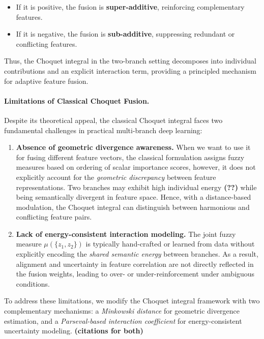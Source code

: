 \documentclass[12pt]{article}
\begin{document}
\begin{itemize}
    \item If it is positive, the fusion is \textbf{super-additive}, reinforcing complementary features.
    \item If it is negative, the fusion is \textbf{sub-additive}, suppressing redundant or conflicting features.
\end{itemize}

Thus, the Choquet integral in the two-branch setting decomposes into individual contributions and an explicit interaction term, providing a principled mechanism for adaptive feature fusion.

\paragraph{Limitations of Classical Choquet Fusion.}
Despite its theoretical appeal, the classical Choquet integral faces two fundamental challenges in practical multi-branch deep learning:

\begin{enumerate}
    \item \textbf{Absence of geometric divergence awareness.} When we want to use it for fusing different feature vectors, the classical formulation assigns fuzzy measures based on ordering of scalar importance scores, however, it does not explicitly account for the \emph{geometric discrepancy} between feature representations. Two branches may exhibit high individual energy \textbf{(??)} while being semantically divergent in feature space. Hence, with a distance-based modulation, the Choquet integral can distinguish between harmonious and conflicting feature pairs.

    \item \textbf{Lack of energy-consistent interaction modeling.} The joint fuzzy measure $\mu(\{z_1, z_2\})$ is typically hand-crafted or learned from data without explicitly encoding the \emph{shared semantic energy} between branches. As a result, alignment and uncertainty in feature correlation are not directly reflected in the fusion weights, leading to over- or under-reinforcement under ambiguous conditions.
\end{enumerate}

To address these limitations, we modify the Choquet integral framework with two complementary mechanisms: a \textit{Minkowski distance} for geometric divergence estimation, and a \textit{Parseval-based interaction coefficient} for energy-consistent uncertainty modeling. \textbf{(citations for both)}
\end{document}
